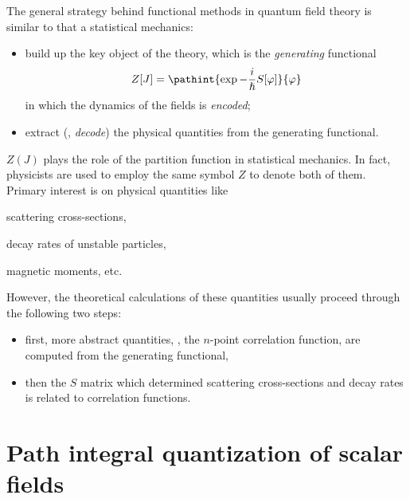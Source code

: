 





The general strategy behind functional methods in quantum field theory is
similar to that a statistical mechanics:
\begin{itemize}
   \item build up the key object of the theory, which is the \emph{generating}
      functional
      \begin{dmath}
	 Z[J]  = \pathint{ \exp{ - \frac{i}{\hslash} S[\varphi]}}{\varphi}
      \end{dmath}
      in which the dynamics of the fields is \emph{encoded};
   \item extract (\ie, \emph{decode}) the physical quantities from the
      generating 
      functional.
\end{itemize}
$Z(J)$ plays the role of the partition function in statistical mechanics.
In fact, physicists are used to employ the same symbol $Z$ to denote
both of them.
Primary interest is on physical quantities like
\begin{inparaenum}[a)]
   \item scattering cross-sections,
   \item decay rates of unstable particles,
   \item magnetic moments, etc.
\end{inparaenum}
However, the theoretical calculations of these quantities usually proceed
through  the following
two steps:
\begin{itemize}
   \item first, more abstract quantities, \ie, the $n$-point correlation
      function, are computed from the generating functional,
   \item then the $S$ matrix which determined scattering cross-sections and
      decay rates is related to correlation functions.
\end{itemize}





\section{Path integral quantization of scalar fields}

